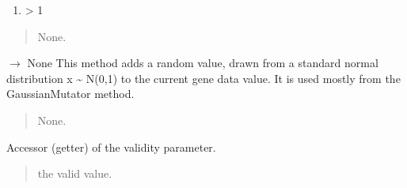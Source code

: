 \documentclass[letterpaper,10pt,english]{sphinxmanual}
\begin{document}
\begin{fulllineitems}
\begin{fulllineitems}
\begin{enumerate}
\end{enumerate}
\begin{enumerate}
%
\setcounter{enumi}{1}
\item {} 
 \sphinxhyphen{}\textgreater{} 1

\end{enumerate}
\begin{quote}\begin{description}
\sphinxAtStartPar
None.

\end{description}\end{quote}

\end{fulllineitems}


\begin{fulllineitems}
\label{\detokenize{pygenalgo.genome:pygenalgo.genome.gene.Gene.gaussian}}
\pysigstartsignatures
\pysiglinewithargsret
{}
{}
{{ $\rightarrow$ None}}
\pysigstopsignatures
\sphinxAtStartPar
This method adds a random value, drawn from a standard normal
distribution x \textasciitilde{} N(0,1) to the current gene data value. It is
used mostly from the GaussianMutator method.
\begin{quote}\begin{description}
\sphinxAtStartPar
None.

\end{description}\end{quote}

\end{fulllineitems}


\begin{fulllineitems}
\label{\detokenize{pygenalgo.genome:pygenalgo.genome.gene.Gene.is_valid}}
\pysigstartsignatures
\pysigline
{}
\pysigstopsignatures
\sphinxAtStartPar
Accessor (getter) of the validity parameter.
\begin{quote}\begin{description}
\sphinxAtStartPar
the valid value.


\end{description}
\end{quote}
\end{fulllineitems}
\end{fulllineitems}
\end{document}
